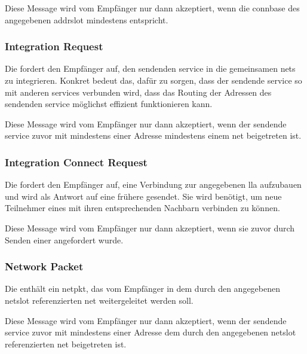 Diese Message wird vom Empfänger nur dann akzeptiert, wenn die \gls{connbase} des angegebenen
\gls{addrslot} mindestens  entspricht.

\isprotonlnbytefield


\subsubsection{Integration Request}
\label{dcl-isproto-ireq}
Die \msg{\isprotoireq} fordert den Empfänger auf, den sendenden \gls{service} in die gemeinsamen
\glspl{net} zu integrieren. Konkret bedeut das, dafür zu sorgen, dass der sendende \gls{service}
so mit anderen \glspl{service} verbunden wird, dass das Routing der Adressen des sendenden
\gls{service} möglichst effizient funktionieren kann.

Diese Message wird vom Empfänger nur dann akzeptiert, wenn der sendende \gls{service} zuvor mit
mindestens einer Adresse mindestens einem \gls{net} beigetreten ist.

\isprotoireqbytefield


\subsubsection{Integration Connect Request}
\label{dcl-isproto-icreq}
Die \msg{\isprotoicreq} fordert den Empfänger auf, eine Verbindung zur angegebenen \gls{lla}
aufzubauen und wird als Antwort auf eine frühere \msg{\isprotoireq} gesendet. Sie wird benötigt,
um neue Teilnehmer eines  mit ihren entsprechenden Nachbarn verbinden zu
können.

Diese Message wird vom Empfänger nur dann akzeptiert, wenn sie zuvor durch Senden einer
\msg{\isprotoireq} angefordert wurde.

\isprotoicreqbytefield


\subsubsection{Network Packet}
\label{dcl-isproto-np}
Die \msg{\isprotonp} enthält ein \gls{netpkt}, das vom Empfänger in dem durch den angegebenen
\gls{netslot} referenzierten \gls{net} weitergeleitet werden soll.

Diese Message wird vom Empfänger nur dann akzeptiert, wenn der sendende \gls{service} zuvor mit
mindestens einer Adresse dem durch den angegebenen \gls{netslot} referenzierten \gls{net}
beigetreten ist.

\isprotonpbytefield


